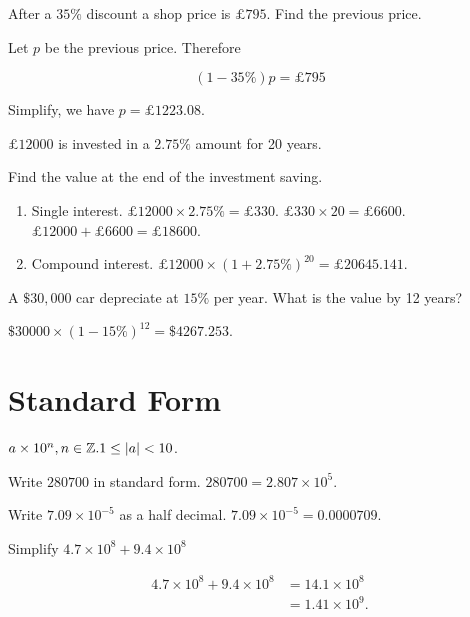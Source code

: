 \documentclass[8pt]{article}
\begin{document}
			\prob After a \(35\%\) discount a shop price is \(\pounds 795\). Find the previous price.
			
			\solution Let \(p\) be the previous price. Therefore
			
			\[(1-35\%)p = \pounds 795\]
			
			Simplify, we have \(p = \pounds 1223.08\).\newline

			\prob \(\pounds 12000\) is invested in a \(2.75\%\) amount for 20 years.

			Find the value at the end of the investment saving.

			\solution

			\begin{enumerate}[label=\methword{(\arabic*)}]
				\item Single interest. \(\pounds 12000 \times 2.75\% = \pounds 330.\) \(\pounds 330 \times 20 = \pounds 6600.\) \(\pounds 12000 + \pounds 6600 = \pounds 18600\).
    			\item Compound interest. \(\pounds 12000 \times (1+2.75\%)^{20} = \pounds 20645.141\).
			\end{enumerate}

			\prob A \(\$30, 000\) car depreciate at \(15\%\) per year. What is the value by 12 years?
			
			\solution \(\$30000 \times (1-15\%)^{12} = \$4267.253\).

	\section{Standard Form}
	
		\defi {} \(a\times 10^n, n \in \mathbb{Z}. 1 \leq \left\lvert a \right\rvert < 10\).

		\exmp {} Write \(280700\) in standard form. \(280700 = 2.807 \times 10^5\).

		\exmp {} Write \(7.09 \times 10^{-5}\) as a half decimal. \(7.09 \times 10^{-5} = 0.0000709\).\newline

		\prob Simplify \(4.7 \times 10^8 + 9.4 \times 10^8\)
		
		\solution
		
		\begin{align*}
			4.7 \times 10^8 + 9.4 \times 10^8 &= 14.1 \times 10^8\\
			&= 1.41 \times 10^9.
		\end{align*}
\end{document}
